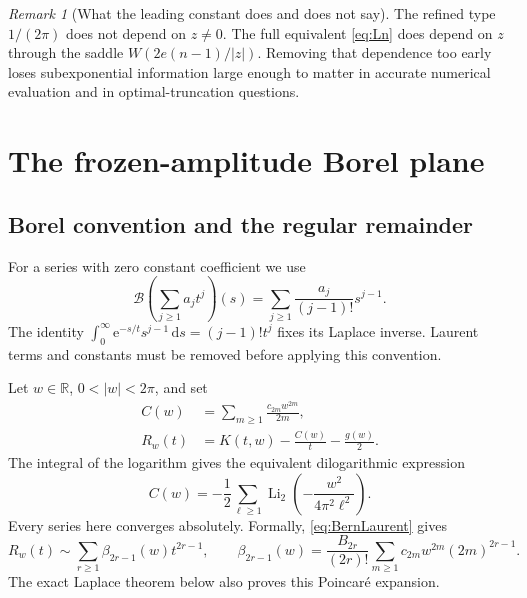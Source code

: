 \documentclass[11pt,a4paper]{article}
\numberwithin{equation}{section}
\theoremstyle{definition}
\theoremstyle{remark}
\newtheorem{remark}[theorem]{Remark}
\newcommand{\R}{\mathbb R}
\newcommand{\e}{\mathrm e}
\newcommand{\dd}{\,\mathrm d}
\newcommand{\Borel}{\mathcal B}
\DeclareMathOperator{\Li}{Li}
\begin{document}
\begin{remark}[What the leading constant does and does not say]
The refined type $1/(2\pi)$ does not depend on $z\ne0$. The full equivalent \eqref{eq:Ln} does depend on $z$ through the saddle $W(2e(n-1)/|z|)$. Removing that dependence too early loses subexponential information large enough to matter in accurate numerical evaluation and in optimal-truncation questions.
\end{remark}

\section{The frozen-amplitude Borel plane}
\label{sec:frozen}

\subsection{Borel convention and the regular remainder}
For a series with zero constant coefficient we use
\begin{equation}
 \Borel\!\left(\sum_{j\ge1}a_jt^j\right)(s)
 =\sum_{j\ge1}\frac{a_j}{(j-1)!}s^{j-1}.
 \label{eq:Bconvention}
\end{equation}
The identity $\int_0^\infty\e^{-s/t}s^{j-1}\dd s=(j-1)!t^j$ fixes its Laplace inverse. Laurent terms and constants must be removed before applying this convention.

Let $w\in\R$, $0<|w|<2\pi$, and set
\begin{align}
 C(w)&=\sum_{m\ge1}\frac{c_{2m}w^{2m}}{2m},\label{eq:C}\\
 R_w(t)&=K(t,w)-\frac{C(w)}t-\frac{g(w)}2.
 \label{eq:Rfrozen}
\end{align}
The integral of the logarithm gives the equivalent dilogarithmic expression
\begin{equation}
 C(w)=-\frac12\sum_{\ell\ge1}
       \Li_2\!\left(-\frac{w^2}{4\pi^2\ell^2}\right).
 \label{eq:Cdilog}
\end{equation}
Every series here converges absolutely. Formally, \eqref{eq:BernLaurent} gives
\begin{equation}
 R_w(t)\sim\sum_{r\ge1}\beta_{2r-1}(w)t^{2r-1},\qquad
 \beta_{2r-1}(w)=\frac{B_{2r}}{(2r)!}
       \sum_{m\ge1}c_{2m}w^{2m}(2m)^{2r-1}.
 \label{eq:beta}
\end{equation}
The exact Laplace theorem below also proves this Poincar\'e expansion.
\end{document}
